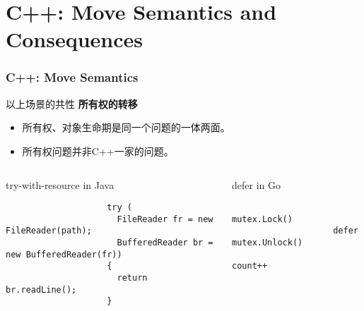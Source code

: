 \documentclass[UTF8,lualatex]{ctexbeamer}
\renewcommand{\emph}[1]{\textbf{#1}}
\begin{document}
\section{C++: Move Semantics and Consequences}

\begin{frame}[fragile]
    \frametitle{C++: Move Semantics}
    \begin{block}{以上场景的共性}
        \emph{所有权的转移}
        \begin{itemize}
        \item 所有权、对象生命期是同一个问题的一体两面。
        \item 所有权问题并非C++一家的问题。
        \end{itemize}
    \end{block}
    \scriptsize
    \begin{columns}[t]
        \begin{column}{.65\textwidth}
            \begin{exampleblock}{try-with-resource in Java}
                \begin{verbatim}
                    try (
                      FileReader fr = new FileReader(path);
                      BufferedReader br = new BufferedReader(fr))
                    {
                      return br.readLine();
                    }
                \end{verbatim}
            \end{exampleblock}
        \end{column}
        \begin{column}{.35\textwidth}
            \begin{exampleblock}{defer in Go}
                \begin{verbatim}
                    mutex.Lock()
                    defer mutex.Unlock()
                    count++
                \end{verbatim}
            \end{exampleblock}
        \end{column}
    \end{columns}
\end{frame}

\end{document}

